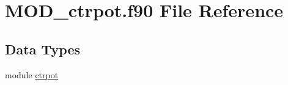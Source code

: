 \hypertarget{MOD__ctrpot_8f90}{\section{M\-O\-D\-\_\-ctrpot.\-f90 File Reference}
\label{MOD__ctrpot_8f90}
}
\subsection*{Data Types}
\begin{DoxyCompactItemize}
\item 
module \hyperlink{classctrpot}{ctrpot}
\end{DoxyCompactItemize}
